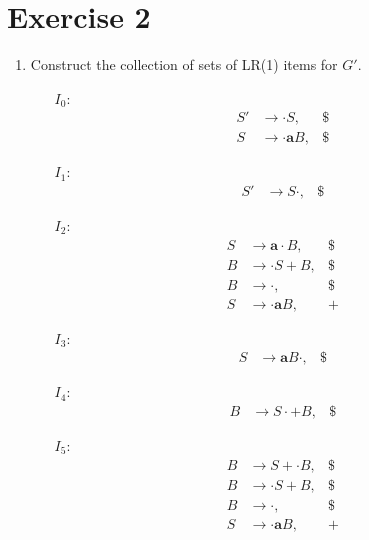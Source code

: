 \documentclass{CompilerAssignment}
\newcommand{\mbfa}{\mathbf{a}}
\begin{document}
\section{Exercise 2}

\begin{enumerate}
    \item Construct the collection of sets of LR(1) items for \(G'\).
    \begin{multicols}{4}
        \begin{enumerate}
            \item[$I_0$:]
            \[
                \begin{aligned}
                    S' & \rightarrow \cdot S,&\$ \\
                    S & \rightarrow \cdot \mbfa B,&\$
                \end{aligned}
            \]
    
            \item[$I_1$:]
            \[
                \begin{aligned}
                    S' & \rightarrow S \cdot,&\$
                \end{aligned}
            \]
    
            \item[$I_2$:]
            \[
                \begin{aligned}
                    S & \rightarrow \mbfa \cdot B,&\$ \\
                    B & \rightarrow \cdot S + B,&\$ \\
                    B & \rightarrow \cdot,&\$ \\
                    S & \rightarrow \cdot \mbfa B,&+
                \end{aligned}
            \]

            \item[$I_3$:]
            \[
                \begin{aligned}
                    S & \rightarrow \mbfa B \cdot,&\$
                \end{aligned}
            \]
    
            \item[$I_4$:]
            \[
                \begin{aligned}
                    B & \rightarrow S \cdot + B,&\$
                \end{aligned}
            \]

            \item[$I_5$:]
            \[
                \begin{aligned}
                    B & \rightarrow S + \cdot B,&\$ \\
                    B & \rightarrow \cdot S + B,&\$ \\
                    B & \rightarrow \cdot,&\$ \\
                    S & \rightarrow \cdot \mbfa B,&+
                \end{aligned}
            \]


\end{enumerate}
\end{multicols}
\end{enumerate}
\end{document}
